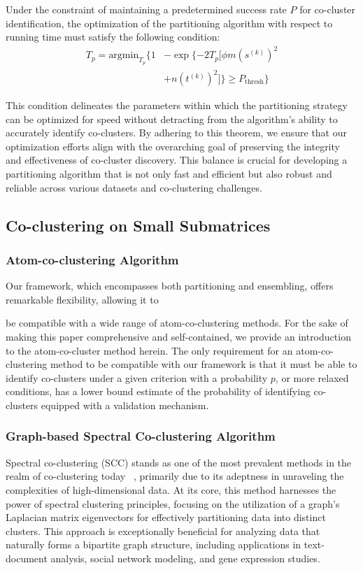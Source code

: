 \documentclass[journal]{IEEEtran}
\renewcommand{\cite}[1]{~\autocite{#1}}
\begin{document}
Under the constraint of maintaining a predetermined success rate $P$ for co-cluster identification, the optimization of the partitioning algorithm with respect to running time must satisfy the following condition:
\begin{align*}
  T_p = \text{argmin}_{T_p} \{
  1 & - \exp \{ -2 T_p [\phi m (s^{(k)})^2         \\
    & + n (t^{(k)})^2] \} \ge P_{\text{thresh}} \}
\end{align*}

This condition delineates the parameters within which the partitioning strategy can be optimized for speed without detracting from the algorithm's ability to accurately identify co-clusters. By adhering to this theorem, we ensure that our optimization efforts align with the overarching goal of preserving the integrity and effectiveness of co-cluster discovery. This balance is crucial for developing a partitioning algorithm that is not only fast and efficient but also robust and reliable across various datasets and co-clustering challenges.

\subsection{Co-clustering on Small Submatrices}

\subsubsection{Atom-co-clustering Algorithm}

Our framework, which encompasses both partitioning and ensembling, offers remarkable flexibility, allowing it to

be compatible with a wide range of atom-co-clustering methods. For the sake of making this paper comprehensive and self-contained, we provide an introduction to the atom-co-cluster method herein. The only requirement for an atom-co-clustering method to be compatible with our framework is that it must be able to identify co-clusters under a given criterion with a probability $p$, or more relaxed conditions, has a lower bound estimate of the probability of identifying co-clusters equipped with a validation mechanism.

\subsubsection{Graph-based Spectral Co-clustering Algorithm}

Spectral co-clustering (SCC) stands as one of the most prevalent methods in the realm of co-clustering today \cite{vonluxburg2007TutorialSpectralClustering}, primarily due to its adeptness in unraveling the complexities of high-dimensional data. At its core, this method harnesses the power of spectral clustering principles, focusing on the utilization of a graph's Laplacian matrix eigenvectors for effectively partitioning data into distinct clusters. This approach is exceptionally beneficial for analyzing data that naturally forms a bipartite graph structure, including applications in text-document analysis, social network modeling, and gene expression studies.
\end{document}
